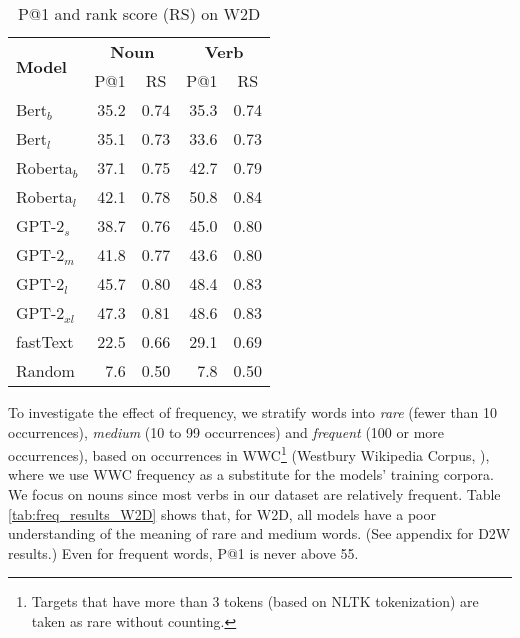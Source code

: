 \documentclass[11pt,a4paper]{article}
\begin{document}
\begin{table}
    \centering
    \begin{tabular}{l|rrrr}
        \hline
         \multirow{2}{*}{\textbf{Model}} & \multicolumn{2}{c}{\textbf{Noun}} & \multicolumn{2}{c}{\textbf{Verb}} \\
         & \multicolumn{1}{c}{P@1} & \multicolumn{1}{c}{RS} & \multicolumn{1}{c}{P@1} & \multicolumn{1}{c}{RS} \\ \hline
     Bert$_{b}$ & 35.2 & 0.74 & 35.3 & 0.74 \\
     Bert$_{l}$ & 35.1 & 0.73 & 33.6 & 0.73 \\
     Roberta$_{b}$ & 37.1 & 0.75 & 42.7 & 0.79 \\
     Roberta$_{l}$ & 42.1 & 0.78 & 50.8 & 0.84 \\ \hline
     GPT-2$_{s}$ & 38.7 & 0.76 & 45.0 & 0.80 \\
     GPT-2$_{m}$ & 41.8 & 0.77 & 43.6 & 0.80 \\
     GPT-2$_{l}$ & 45.7 & 0.80 & 48.4 & 0.83 \\
     GPT-2$_{xl}$ & 47.3 & 0.81 & 48.6 & 0.83 \\
     \hline 
     fastText & 22.5 & 0.66 & 29.1 & 0.69 \\ \hline 
     Random & 7.6 & 0.50 & 7.8 & 0.50 \\\hline
     
    \end{tabular}
    \caption{P@1 and rank score (RS) on W2D}
    \label{tab:results_W2D}
\end{table}


To investigate the effect of frequency,
we stratify words into \textit{rare} (fewer than 10 occurrences), \textit{medium} (10 to 99 occurrences) and \textit{frequent} (100 or more occurrences), based on occurrences in WWC\footnote{Targets that have more than 3 tokens (based on NLTK tokenization) are taken as rare without counting.} (Westbury Wikipedia Corpus, ), where we use WWC frequency as a substitute for the models' training corpora. 
We focus on nouns since most verbs in our dataset are relatively frequent. 
Table \ref{tab:freq_results_W2D} shows that, for W2D, all models have a poor understanding of the meaning of rare and medium words. (See appendix for D2W results.) 
Even for frequent words, P@1 is never above 55.
\end{document}
